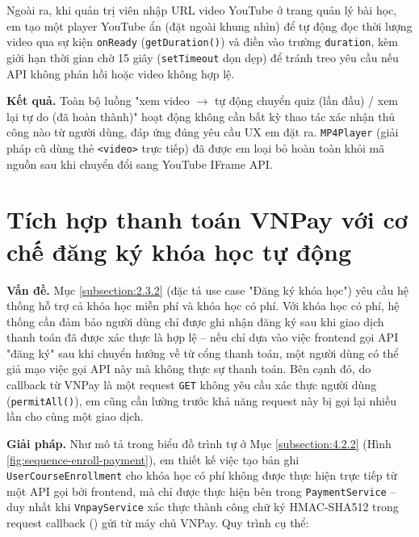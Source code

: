 \documentclass[../DoAn.tex]{subfiles}
\begin{document}
Ngoài ra, khi quản trị viên nhập URL video YouTube ở trang quản lý bài học, em tạo một player YouTube ẩn (đặt ngoài khung nhìn) để tự động đọc thời lượng video qua sự kiện \texttt{onReady} (\texttt{getDuration()}) và điền vào trường \texttt{duration}, kèm giới hạn thời gian chờ 15 giây (\texttt{setTimeout} dọn dẹp) để tránh treo yêu cầu nếu API không phản hồi hoặc video không hợp lệ.

\textbf{Kết quả.} Toàn bộ luồng "xem video \(\to\) tự động chuyển quiz (lần đầu) / xem lại tự do (đã hoàn thành)" hoạt động không cần bất kỳ thao tác xác nhận thủ công nào từ người dùng, đáp ứng đúng yêu cầu UX em đặt ra. \texttt{MP4Player} (giải pháp cũ dùng thẻ \texttt{<video>} trực tiếp) đã được em loại bỏ hoàn toàn khỏi mã nguồn sau khi chuyển đổi sang YouTube IFrame API.

\section{Tích hợp thanh toán VNPay với cơ chế đăng ký khóa học tự động}
\label{section:5.6}

\textbf{Vấn đề.} Mục \ref{subsection:2.3.2} (đặc tả use case "Đăng ký khóa học") yêu cầu hệ thống hỗ trợ cả khóa học miễn phí và khóa học có phí. Với khóa học có phí, hệ thống cần đảm bảo người dùng chỉ được ghi nhận đăng ký sau khi giao dịch thanh toán đã được xác thực là hợp lệ -- nếu chỉ dựa vào việc frontend gọi API "đăng ký" sau khi chuyển hướng về từ cổng thanh toán, một người dùng có thể giả mạo việc gọi API này mà không thực sự thanh toán. Bên cạnh đó, do callback từ VNPay là một request \texttt{GET} không yêu cầu xác thực người dùng (\texttt{permitAll()}), em cũng cần lường trước khả năng request này bị gọi lại nhiều lần cho cùng một giao dịch.

\textbf{Giải pháp.} Như mô tả trong biểu đồ trình tự ở Mục \ref{subsection:4.2.2} (Hình \ref{fig:sequence-enroll-payment}), em thiết kế việc tạo bản ghi \texttt{UserCourseEnrollment} cho khóa học có phí không được thực hiện trực tiếp từ một API gọi bởi frontend, mà chỉ được thực hiện bên trong \texttt{PaymentService} -- duy nhất khi \texttt{VnpayService} xác thực thành công chữ ký HMAC-SHA512 trong request callback (\texttt{}) gửi từ máy chủ VNPay. Quy trình cụ thể:
\end{document}
